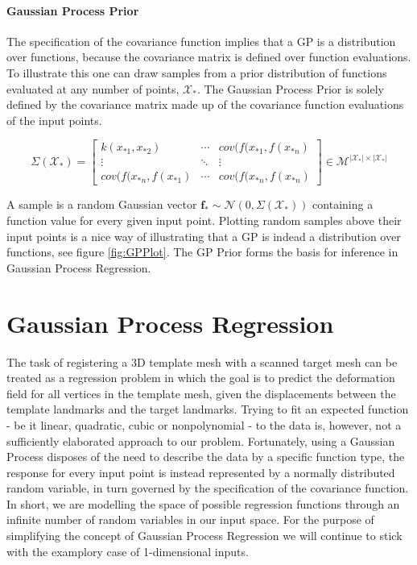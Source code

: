 \paragraph{Gaussian Process Prior}
The specification of the covariance function implies that a GP is a distribution over functions, because the covariance matrix is defined over function evaluations. To illustrate this one can draw samples from a prior distribution of functions evaluated at any number of points, $\mathcal{X}_{*}$. The Gaussian Process Prior is solely defined by the covariance matrix made up of the covariance function evaluations of the input points.

\begin{equation}
    \Sigma(\mathcal{X}_{*})=\begin{bmatrix}
k(x_{*1},x_{*2}) & \cdots & cov(f(x_{*1},f(x_{*n}) \\
\vdots & \ddots & \vdots \\
cov(f(x_{*n},f(x_{*1}) & \cdots & cov(f(x_{*n},f(x_{*n}) 
\end{bmatrix} \in \mathcal{M}^{\left|\mathcal{X}_{*}\right| \times \left|\mathcal{X}_{*}\right|} 
\end{equation}

A sample is a random Gaussian vector $\textbf{f}_{*} \sim \mathcal{N}(0, \Sigma(\mathcal{X}_{*}))$ containing a function value for every given input point. Plotting random
samples above their input points is a nice way of illustrating that a GP is indead a distribution over functions, see figure \ref{fig:GPPlot}. The GP Prior forms the basis for inference in Gaussian Process Regression.

\section{Gaussian Process Regression}
The task of registering a 3D template mesh with a scanned target mesh can be treated as a regression problem in which the goal is to predict the deformation field for all vertices in the template mesh, given the displacements between the template landmarks and the target landmarks. Trying to fit an expected function - be it linear, quadratic, cubic or nonpolynomial - to the data is, however, not a sufficiently elaborated approach to our problem. 
Fortunately, using a Gaussian Process disposes of the need to describe the data by a specific function type, the response for every input point is instead represented by a normally distributed random variable, in turn governed by the specification of the covariance function. In short, we are modelling the space of possible regression functions through an infinite number of random variables in our input space. For the purpose of simplifying the concept of Gaussian Process Regression we will continue to stick with the examplory case of 1-dimensional inputs.

